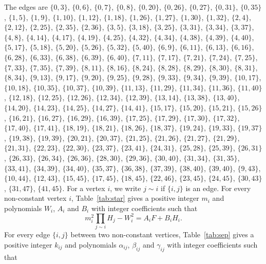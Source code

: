 \documentclass[11pt]{article}
\begin{document}
The edges are $\{0,3\}$, $\{0,6\}$, $\{0,7\}$, $\{0,8\}$, $\{0,20\}$, $\{0,26\}$, $\{0,27\}$, $\{0,31\}$, $\{0,35\}$, $\{1,5\}$, $\{1,9\}$, $\{1,10\}$, $\{1,12\}$, $\{1,18\}$, $\{1,26\}$, $\{1,27\}$, $\{1,30\}$, $\{1,32\}$, $\{2,4\}$, $\{2,12\}$, $\{2,25\}$, $\{2,35\}$, $\{2,36\}$, $\{3,5\}$, $\{3,18\}$, $\{3,25\}$, $\{3,31\}$, $\{3,34\}$, $\{3,37\}$, $\{4,8\}$, $\{4,14\}$, $\{4,17\}$, $\{4,19\}$, $\{4,25\}$, $\{4,32\}$, $\{4,34\}$, $\{4,38\}$, $\{4,39\}$, $\{4,40\}$, $\{5,17\}$, $\{5,18\}$, $\{5,20\}$, $\{5,26\}$, $\{5,32\}$, $\{5,40\}$, $\{6,9\}$, $\{6,11\}$, $\{6,13\}$, $\{6,16\}$, $\{6,28\}$, $\{6,33\}$, $\{6,38\}$, $\{6,39\}$, $\{6,40\}$, $\{7,11\}$, $\{7,17\}$, $\{7,21\}$, $\{7,24\}$, $\{7,25\}$, $\{7,33\}$, $\{7,35\}$, $\{7,39\}$, $\{8,11\}$, $\{8,16\}$, $\{8,24\}$, $\{8,28\}$, $\{8,29\}$, $\{8,30\}$, $\{8,31\}$, $\{8,34\}$, $\{9,13\}$, $\{9,17\}$, $\{9,20\}$, $\{9,25\}$, $\{9,28\}$, $\{9,33\}$, $\{9,34\}$, $\{9,39\}$, $\{10,17\}$, $\{10,18\}$, $\{10,35\}$, $\{10,37\}$, $\{10,39\}$, $\{11,13\}$, $\{11,29\}$, $\{11,34\}$, $\{11,36\}$, $\{11,40\}$, $\{12,18\}$, $\{12,25\}$, $\{12,26\}$, $\{12,34\}$, $\{12,39\}$, $\{13,14\}$, $\{13,38\}$, $\{13,40\}$, $\{14,20\}$, $\{14,23\}$, $\{14,25\}$, $\{14,27\}$, $\{14,41\}$, $\{15,17\}$, $\{15,20\}$, $\{15,21\}$, $\{15,26\}$, $\{16,21\}$, $\{16,27\}$, $\{16,29\}$, $\{16,39\}$, $\{17,25\}$, $\{17,29\}$, $\{17,30\}$, $\{17,32\}$, $\{17,40\}$, $\{17,41\}$, $\{18,19\}$, $\{18,21\}$, $\{18,26\}$, $\{18,37\}$, $\{19,24\}$, $\{19,33\}$, $\{19,37\}$, $\{19,38\}$, $\{19,39\}$, $\{20,21\}$, $\{20,37\}$, $\{21,25\}$, $\{21,26\}$, $\{21,27\}$, $\{21,29\}$, $\{21,31\}$, $\{22,23\}$, $\{22,30\}$, $\{23,37\}$, $\{23,41\}$, $\{24,31\}$, $\{25,28\}$, $\{25,39\}$, $\{26,31\}$, $\{26,33\}$, $\{26,34\}$, $\{26,36\}$, $\{28,30\}$, $\{29,36\}$, $\{30,40\}$, $\{31,34\}$, $\{31,35\}$, $\{33,41\}$, $\{34,39\}$, $\{34,40\}$, $\{35,37\}$, $\{36,38\}$, $\{37,39\}$, $\{38,40\}$, $\{39,40\}$, $\{9,43\}$, $\{10,44\}$, $\{12,43\}$, $\{15,45\}$, $\{17,45\}$, $\{18,45\}$, $\{22,46\}$, $\{23,45\}$, $\{24,45\}$, $\{30,43\}$, $\{31,47\}$, $\{41,45\}$. For a vertex $i$, we write $j\sim i$ if $\{i,j\}$ is an edge.
For every non-constant vertex $i$, Table~\ref{tab:star} gives a positive integer $m_{i}$ and polynomials $W_{i}$, $A_{i}$ and $B_{i}$ with integer coefficients such that
\begin{equation}\label{eq:star}
m_i^2\prod_{j\sim i}H_j-W_i^2=A_iF+B_iH_i.
\end{equation}
For every edge $\{i,j\}$ between two non-constant vertices, Table~\ref{tab:sep} gives a positive integer $k_{ij}$ and polynomials $\alpha_{ij}$, $\beta_{ij}$ and $\gamma_{ij}$ with integer coefficients such that
\end{document}
